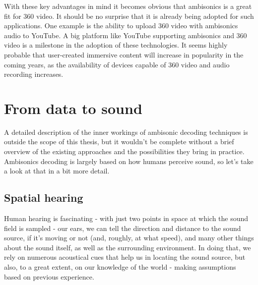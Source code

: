 With these key advantages in mind it becomes obvious that ambisonics is a great fit for 360\degree{} video.
It should be no surprise that it is already being adopted for such applications. 
One example is the ability to upload 360\degree{} video with ambisonics audio to YouTube. \cite{youtube_ambisonics}
A big platform like YouTube supporting ambisonics and 360\degree{} video is a milestone in the adoption
of these technologies. It seems highly probable that user-created immersive content 
will increase in popularity in the coming years, as the availability of devices capable of 360\degree{}
video and audio recording increases. %

\section{From data to sound}

A detailed description of the inner workings of ambisonic decoding techniques is outside the scope of this thesis, 
but it wouldn't be complete without a brief overview of the existing approaches and the possibilities they bring in practice.
Ambisonics decoding is largely based on how humans perceive sound, so let's take a look at that in a bit more detail.

\subsection{Spatial hearing} \label{subsection:spatial_hearing}

Human hearing is fascinating - with just two points in space at which the sound field is sampled - our ears, 
we can tell the direction and distance to the sound source, if it's moving or not (and, roughly, at what speed), 
and many other things about the sound itself, as well as the surrounding environment.
In doing that, we rely on numerous acoustical cues that help us in locating the sound source,
but also, to a great extent, on our knowledge of the world - making assumptions based on previous experience. \cite{localization_clinical_neurology}\cite{auditory_distance}\cite{new_realities_in_audio}

